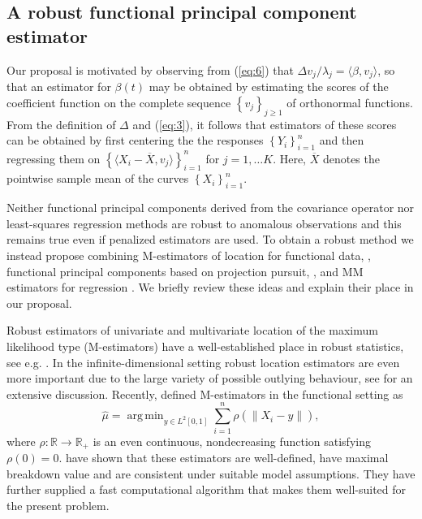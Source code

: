 \documentclass[11pt]{article}
\DeclareMathOperator*{\argmin}{arg\,min}
\begin{document}
\subsection{A robust functional principal component estimator}

Our proposal is motivated by observing from (\ref{eq:6}) that $\Delta v_j/ \lambda_j = \langle \beta, v_j \rangle$, so that an estimator for $\beta(t)$ may be obtained by estimating the scores of the coefficient function on the complete sequence $\left\{ v_j \right\}_{j \geq 1}$ of orthonormal functions. From the definition of $\Delta$ and (\ref{eq:3}), it follows that estimators of these scores can be obtained by  first centering the the responses $\left\{Y_i \right\}_{i=1}^n$ and then regressing them  on $\left\{ \langle X_i - \overline{X}, v_j \rangle \right\}_{i=1}^n$ for $ j = 1, \ldots K$. Here, $\overline{X}$ denotes the pointwise sample mean of the curves $\left\{X_i\right\}_{i=1}^n$. 

Neither functional principal components derived from the covariance operator nor least-squares regression methods are robust to anomalous observations and this remains true even if penalized estimators are used. To obtain a robust method we instead propose combining M-estimators of location for functional data, \citep{sinova2018m}, functional principal components based on projection pursuit, \citep{bali2011robust}, and MM estimators for regression \citep{yohai1987high}. We briefly review these ideas and explain their place in our proposal.

Robust estimators of univariate and multivariate location of the maximum likelihood type (M-estimators) have a well-established place in robust statistics, see e.g. \citet{huber2009robust}. In the infinite-dimensional setting robust location estimators are even more important due to the large variety of possible outlying behaviour, see \cite{hubert2015multivariate} for an extensive discussion. Recently, \cite{sinova2018m} defined M-estimators in the functional setting as
\begin{equation}
\label{eq:8}
\widehat{\mu} =  \argmin_{y\in L^2[0,1]} \sum_{i=1}^n \rho\left( \left\| X_i-y\right\| \right),
\end{equation}
where $\rho:\mathbb{R}\to \mathbb{R}_{+}$ is an even continuous, nondecreasing function satisfying $\rho(0)=0$.  \cite{sinova2018m} have shown that these estimators are well-defined, have maximal breakdown value and are consistent under suitable model assumptions. They have further supplied a fast computational algorithm that makes them well-suited for the present problem.
\end{document}
